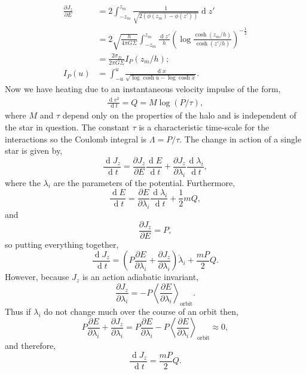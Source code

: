 \documentclass[usenatbib]{mnras}
\renewcommand{\d}[1]{\! \mathrm{d}#1 \:}
\newcommand{\deriv}[2]{\frac{\d{#1}}{\d{#2}}}
\newcommand{\pderiv}[2]{\frac{\partial{#1}}{\partial{#2}}}
\newcommand{\EV}[1]{\left< #1 \right>}
\renewcommand{\d}[1]{\ensuremath{\operatorname{d}\!{#1}}}
\begin{document}
\begin{align}
\pderiv{J_z}{E} & = 2 \int_{-z_m}^{z_m} \frac{1}{\sqrt{2 ( \phi(z_m) - \phi(z') )}} \d{z'} 
\\
& = 2 \sqrt{\frac{h}{4 \pi G \Sigma }} \int_{-z_m}^{z_m}  \frac{\d{z'}}{h} \left( \log{\frac{\cosh{(z_m / h)}}{\cosh{(z'/ h)}}} \right)^{-\frac{1}{2}}
\\
& = \frac{2 \sigma_D}{2 \pi G \Sigma} I_P(z_m / h);
\\
I_P(u) & = \int_{-u}^u \frac{\d{x}}{\sqrt{\log{\cosh{u}} - \log{\cosh{x}}}}.
\end{align}
Now we have heating due to an instantaneous velocity impulse of the form,
\begin{align*}
\deriv{v^2}{t} = Q = M \log{(P / \tau)},
\end{align*}  
where $M$ and $\tau$ depend only on the properties of the halo and is independent of the star in question. The constant $\tau$ is a characteristic time-scale for the interactions so the Coulomb integral is $\Lambda = P / \tau$. The change in action of a single star is given by,
\begin{equation}
\deriv{J_z}{t} = \pderiv{J_z}{E} \deriv{E}{t} + \pderiv{J_z}{\lambda_i} \deriv{\lambda_i}{t},
\end{equation}
where the $\lambda_i$ are the parameters of the potential. Furthermore,
\begin{equation}
\deriv{E}{t} = \pderiv{E}{\lambda_i} \deriv{\lambda_i}{t} + \frac{1}{2} m Q,
\end{equation}
and 
\begin{equation}
\pderiv{J_z}{E} = P,
\end{equation}
so putting everything together,
\begin{equation}
 \deriv{J_z}{t} = \left( P \pderiv{E}{\lambda_i} + \pderiv{J_z}{\lambda_i} \right) \dot{\lambda}_i + \frac{mP}{2} Q.
\end{equation}
However, because $J_z$ is an action adiabatic invariant,
\begin{equation}
\pderiv{J_z}{\lambda_i} = - P \EV{\pderiv{E}{\lambda_i}}_{\text{orbit}}.
\end{equation}
Thus if $\lambda_i$ do not change much over the course of an orbit then,
\begin{equation}
P \pderiv{E}{\lambda_i} + \pderiv{J_z}{\lambda_i}  =  P \pderiv{E}{\lambda_i} - P \EV{\pderiv{E}{\lambda_i}}_{\text{orbit}}  \approx 0,
\end{equation}
and therefore,
\begin{equation}
\deriv{J_z}{t} = \frac{m P}{2} Q.
\end{equation}
\end{document}
